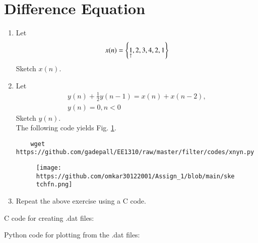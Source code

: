 \documentclass[journal,12pt,twocolumn]{IEEEtran}
\renewcommand\thesection{\arabic{section}}
\begin{document}
\section{Difference Equation}
\begin{enumerate}[label=\thesection.\arabic*,ref=\thesection.\theenumi]
\item Let
\label{def:xn}
\begin{equation}
	x(n) = \left\{\underset{\uparrow}{1},2,3,4,2,1\right\}
\end{equation}
Sketch $x(n)$.
\item Let
\begin{multline}
	\label{eq:iir_filter}
	y(n) + \frac{1}{2}y(n-1) = x(n) + x(n-2), 
	\\
	y(n) = 0, n < 0
\end{multline}
Sketch $y(n)$.  
\\
\solution The following code yields Fig. \ref{fig:xnyn}.
\begin{lstlisting}
	wget https://github.com/gadepall/EE1310/raw/master/filter/codes/xnyn.py
\end{lstlisting}
\begin{figure}[!ht]
	\begin{center}
		\texttt{[image: https://github.com/omkar30122001/Assign\_1/blob/main/sketchfn.png]}
	\end{center}
	\label{fig:xnyn}	
\end{figure}
\item Repeat the above exercise using a C code.
\end{enumerate}
\solution
C code for creating .dat files:

Python code for plotting from the .dat files:

\end{document}
